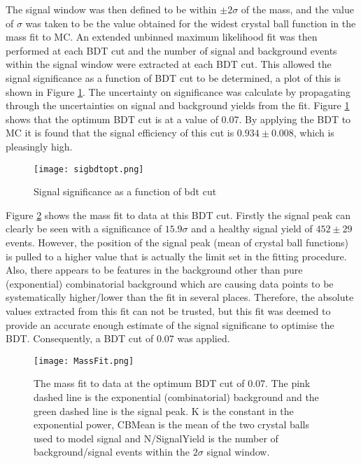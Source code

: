   The signal window was then defined to be within $\pm2\sigma$ of the \Bd mass, and the value of $\sigma$ was taken to be the value obtained for the widest crystal ball function in the mass fit to MC. An extended unbinned maximum likelihood fit was then performed at each BDT cut and the number of signal and background events within the signal window were extracted at each BDT cut.  This allowed the signal significance as a function of BDT cut to be determined, a plot of this is shown in Figure \ref{fig:bdtsigopt}.  The uncertainty on significance was calculate by propagating through the uncertainties on signal and background yields from the fit.  Figure \ref{fig:bdtsigopt} shows that the optimum BDT cut is at a value of 0.07.  By applying the BDT to MC it is found that the signal efficiency of this cut is $0.934\pm0.008$, which is pleasingly high.

\begin{figure}[h]
  \centering
  \texttt{[image: sigbdtopt.png]}
  \caption{Signal significance as a function of bdt cut}
  \label{fig:bdtsigopt}
\end{figure}

Figure \ref{fig:massfit} shows the mass fit to data at this BDT cut.  Firstly the signal peak can clearly be seen with a significance of $15.9\sigma$ and a healthy signal yield of $452\pm29$ events.  However, the position of the signal peak (mean of crystal ball functions) is pulled to a higher value that is actually the limit set in the fitting procedure.  Also, there appears to be features in the background other than pure (exponential) combinatorial background which are causing data points to be systematically higher/lower than the fit in several places.  Therefore, the absolute values extracted from this fit can not be trusted, but this fit was deemed to provide an accurate enough estimate of the signal significane to optimise the BDT.  Consequently, a BDT cut of 0.07 was applied.

\begin{figure}[h]
  \centering
  \texttt{[image: MassFit.png]}
  \caption{The mass fit to data at the optimum BDT cut of 0.07.  The pink dashed line is the exponential (combinatorial) background and the green dashed line is the signal peak.  K is the constant in the exponential power, CBMean is the mean of the two crystal balls used to model signal and N/SignalYield is the number of background/signal events within the $2\sigma$ signal window.}
  \label{fig:massfit}
\end{figure}


